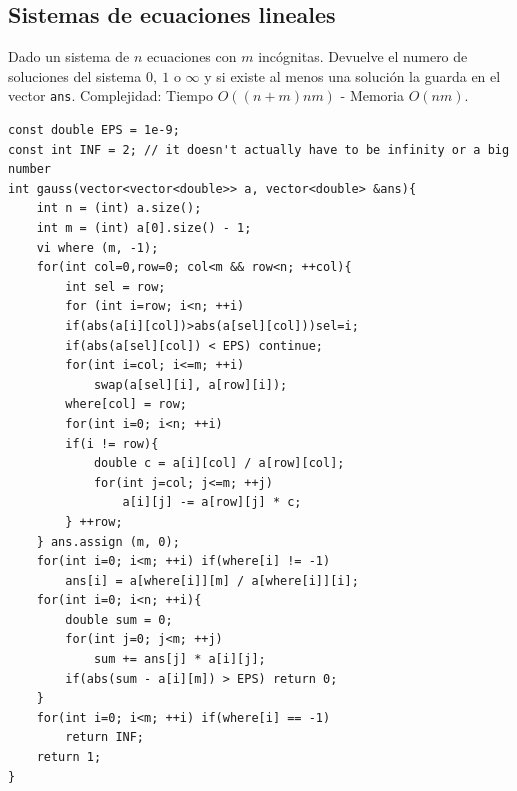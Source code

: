 \documentclass[10pt,spanish,mexico]{article}
\numberwithin{equation}{section}
\begin{document}
\begin{multicols}{2}
\vspace{-1.2\baselineskip}
\hrulefill
\subsection{Sistemas de ecuaciones lineales }
Dado un sistema de $n$ ecuaciones  con $m$ incógnitas. Devuelve el numero de soluciones del sistema $0, \ 1 $ o $\infty$ y si existe al menos una solución la guarda en el vector \texttt{ans}. Complejidad: Tiempo $O(  (n+m)nm ) $ - Memoria $O(nm)$.
\begin{verbatim}
const double EPS = 1e-9;
const int INF = 2; // it doesn't actually have to be infinity or a big number
int gauss(vector<vector<double>> a, vector<double> &ans){
    int n = (int) a.size();
    int m = (int) a[0].size() - 1;
    vi where (m, -1);
    for(int col=0,row=0; col<m && row<n; ++col){
        int sel = row;
        for (int i=row; i<n; ++i)
        if(abs(a[i][col])>abs(a[sel][col]))sel=i;
        if(abs(a[sel][col]) < EPS) continue;
        for(int i=col; i<=m; ++i)
            swap(a[sel][i], a[row][i]);
        where[col] = row;
        for(int i=0; i<n; ++i)
        if(i != row){
            double c = a[i][col] / a[row][col];
            for(int j=col; j<=m; ++j)
                a[i][j] -= a[row][j] * c;
        } ++row;
    } ans.assign (m, 0);
    for(int i=0; i<m; ++i) if(where[i] != -1)
        ans[i] = a[where[i]][m] / a[where[i]][i];
    for(int i=0; i<n; ++i){
        double sum = 0;
        for(int j=0; j<m; ++j)
            sum += ans[j] * a[i][j];
        if(abs(sum - a[i][m]) > EPS) return 0;
    }
    for(int i=0; i<m; ++i) if(where[i] == -1)
        return INF;
    return 1;
}
\end{verbatim}

\vspace{-1.2\baselineskip}
\hrulefill

\end{multicols}
\end{document}
